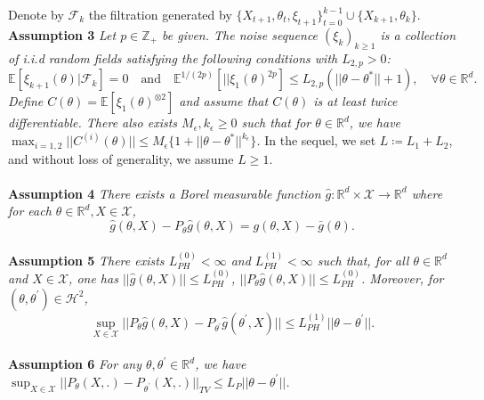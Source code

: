 \documentclass[a4paper]{article}
\begin{document}
Denote by $\mathcal{F}_{k}$ the filtration generated by $\{X_{t + 1}, \theta_{t}, \xi_{t + 1}\}_{t = 0}^{k - 1} \cup \{X_{k + 1}, \theta_{k}\}$.
\\
\textbf{Assumption 3} \textit{
	Let $p \in \mathbb{Z}_{+}$ be given. The noise sequence $\left(\xi_{k}\right)_{k \ge 1}$ is a collection of i.i.d random fields satisfying the following conditions with $L_{2, p} > 0$:
	$$\mathbb{E}\left[\xi_{k + 1}(\theta) | \mathcal{F}_{k}\right] = 0 \quad \text{and} \quad \mathbb{E}^{1 / (2p)}\left[||\xi_{1}(\theta)^{2p}\right] \le L_{2, p}\left(||\theta - \theta^{*}|| + 1\right), \quad \forall \theta \in \mathbb{R}^{d}.$$
	Define $C(\theta) = \mathbb{E}\left[\xi_{1}(\theta)^{\otimes 2}\right]$ and assume that $C(\theta)$ is at least twice differentiable. There also exists $M_{\epsilon}, k_{\epsilon} \ge 0$ such that for $\theta \in \mathbb{R}^{d}$, we have $\max_{i = 1, 2}||C^{(i)}(\theta)|| \le M_{\epsilon}\{1 + ||\theta - \theta^{*}||^{k_{\epsilon}}\}$.
}
In the sequel, we set $L \coloneq L_{1} + L_{2}$, and without loss of generality, we assume $L \ge 1$.
\\
\\
\textbf{Assumption 4} \textit{
There exists a Borel measurable function $\hat{g}: \mathbb{R}^{d} \times \mathcal{X} \to \mathbb{R}^{d}$ where for each $\theta \in \mathbb{R}^{d}, X \in \mathcal{X}$,
\begin{equation}
	\hat{g}\left(\theta, X\right) - P_{\theta}\hat{g}\left(\theta, X\right) = g\left(\theta, X\right) - \bar{g}\left(\theta\right).
\end{equation}
}
\\
\textbf{Assumption 5} \textit{
There exists $L_{PH}^{(0)} <‌ \infty$ and $L_{PH}^{(1)} < \infty$ such that, for all $\theta \in \mathbb{R}^{d}$ and $X \in \mathcal{X}$, one has $||\hat{g}\left(\theta, X\right)|| \le L_{PH}^{(0)}$, $||P_{\theta}\hat{g}\left(\theta, X\right)|| \le L_{PH}^{(0)}$. Moreover, for $\left(\theta, \theta^{\prime}\right) \in \mathcal{H}^{2}$,
\begin{equation}
	\sup_{X \in \mathcal{X}}||P_{\theta}\hat{g}\left(\theta, X\right) - P_{\theta^{\prime}}\hat{g}\left(\theta^{\prime}, X\right)|| \le L_{PH}^{(1)}||\theta - \theta^{\prime}||.
\end{equation}
}
\\
\textbf{Assumption 6} \textit{
For any $\theta, \theta^{\prime} \in \mathbb{R}^{d}$, we have $\sup_{X \in \mathcal{X}}||P_{\theta}\left(X, .\right) - P_{\theta^{\prime}}\left(X, .\right)||_{TV} \le L_{P}||\theta - \theta^{\prime}||$.
}
\end{document}
